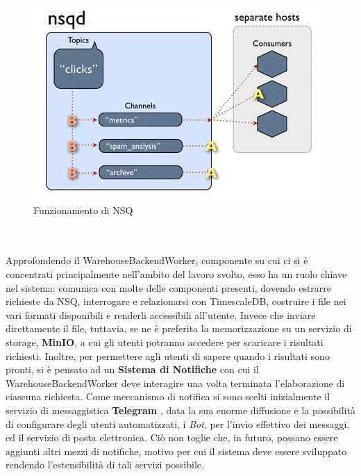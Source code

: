 \begin{figure}[h!]
    \centering
    \includegraphics[scale=0.84]{images/nsq.jpg}
    \caption{Funzionamento di NSQ}
    \label{fig:nsq}
\end{figure}\\ \\
Approfondendo il WarehouseBackendWorker, componente su cui ci si è concentrati principalmente nell'ambito del lavoro svolto, esso ha un ruolo chiave nel sistema: comunica con molte delle componenti presenti, dovendo estrarre richieste da NSQ, interrogare e relazionarsi con TimescaleDB, costruire i file nei vari formati disponibili e renderli accessibili all'utente. Invece che inviare direttamente il file, tuttavia, se ne è preferita la memorizzazione su un servizio di storage, \textbf{MinIO}, a cui gli utenti potranno accedere per scaricare i risultati richiesti. Inoltre, per permettere agli utenti di sapere quando i risultati sono pronti, si è pensato ad un \textbf{Sistema di Notifiche} con cui il WarehouseBackendWorker deve interagire una volta terminata l'elaborazione di ciascuna richiesta. Come meccanismo di notifica si sono scelti inizialmente il servizio di messaggistica \textbf{Telegram} \cite{telegram}, data la sua enorme diffusione e la possibilità di configurare degli utenti automatizzati, i \textit{Bot}, per l'invio effettivo dei messaggi, ed il servizio di posta elettronica. Ciò non toglie che, in futuro, possano essere aggiunti altri mezzi di notifiche, motivo per cui il sistema deve essere sviluppato rendendo l'estensibilità di tali servizi possibile.

